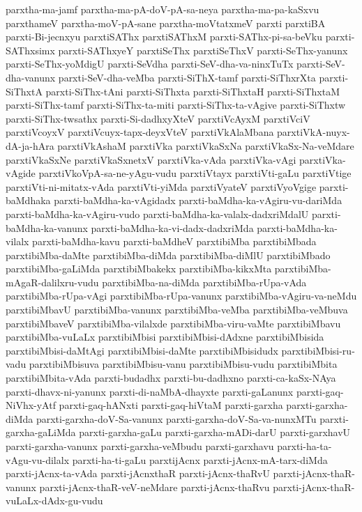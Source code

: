 {parxtha-ma-jamf
parxtha-ma-pA-doV-pA-sa-neya
parxtha-ma-pa-kaSxvu
parxthameV
parxtha-moV-pA-sane
parxtha-moVtatxmeV
parxti
parxtiBA
parxti-Bi-jecnxyu
parxtiSAThx
parxtiSAThxM
parxti-SAThx-pi-sa-beVku
parxti-SAThxsimx
parxti-SAThxyeY
parxtiSeThx
parxtiSeThxV
parxti-SeThx-yanunx
parxti-SeThx-yoMdigU
parxti-SeVdha
parxti-SeV-dha-va-ninxTuTx
parxti-SeV-dha-vanunx
parxti-SeV-dha-veMba
parxti-SiThX-tamf
parxti-SiThxrXta
parxti-SiThxtA
parxti-SiThx-tAni
parxti-SiThxta
parxti-SiThxtaH
parxti-SiThxtaM
parxti-SiThx-tamf
parxti-SiThx-ta-miti
parxti-SiThx-ta-vAgive
parxti-SiThxtw
parxti-SiThx-twsathx
parxti-Si-dadhxyXteV
parxtiVcAyxM
parxtiVciV
parxtiVcoyxV
parxtiVcuyx-tapx-deyxVteV
parxtiVkAlaMbana
parxtiVkA-nuyx-dA-ja-hAra
parxtiVkAshaM
parxtiVka
parxtiVkaSxNa
parxtiVkaSx-Na-veMdare
parxtiVkaSxNe
parxtiVkaSxnetxV
parxtiVka-vAda
parxtiVka-vAgi
parxtiVka-vAgide
parxtiVkoVpA-sa-ne-yAgu-vudu
parxtiVtayx
parxtiVti-gaLu
parxtiVtige
parxtiVti-ni-mitatx-vAda
parxtiVti-yiMda
parxtiVyateV
parxtiVyoVgige
parxti-baMdhaka
parxti-baMdha-ka-vAgidadx
parxti-baMdha-ka-vAgiru-vu-dariMda
parxti-baMdha-ka-vAgiru-vudo
parxti-baMdha-ka-valalx-dadxriMdalU
parxti-baMdha-ka-vanunx
parxti-baMdha-ka-vi-dadx-dadxriMda
parxti-baMdha-ka-vilalx
parxti-baMdha-kavu
parxti-baMdheV
parxtibiMba
parxtibiMbada
parxtibiMba-daMte
parxtibiMba-diMda
parxtibiMba-diMlU
parxtibiMbado
parxtibiMba-gaLiMda
parxtibiMbakekx
parxtibiMba-kikxMta
parxtibiMba-mAgaR-dalilxru-vudu
parxtibiMba-na-diMda
parxtibiMba-rUpa-vAda
parxtibiMba-rUpa-vAgi
parxtibiMba-rUpa-vanunx
parxtibiMba-vAgiru-va-neMdu
parxtibiMbavU
parxtibiMba-vanunx
parxtibiMba-veMba
parxtibiMba-veMbuva
parxtibiMbaveV
parxtibiMba-vilalxde
parxtibiMba-viru-vaMte
parxtibiMbavu
parxtibiMba-vuLaLx
parxtibiMbisi
parxtibiMbisi-dAdxne
parxtibiMbisida
parxtibiMbisi-daMtAgi
parxtibiMbisi-daMte
parxtibiMbisidudx
parxtibiMbisi-ru-vadu
parxtibiMbisuva
parxtibiMbisu-vanu
parxtibiMbisu-vudu
parxtibiMbita
parxtibiMbita-vAda
parxti-budadhx
parxti-bu-dadhxno
parxti-ca-kaSx-NAya
parxti-dhavx-ni-yanunx
parxti-di-naMbA-dhayxte
parxti-gaLanunx
parxti-gaq-NiVhx-yAtf
parxti-gaq-hANxti
parxti-gaq-hiVtaM
parxti-garxha
parxti-garxha-diMda
parxti-garxha-doV-Sa-vanunx
parxti-garxha-doV-Sa-va-nunxMTu
parxti-garxha-gaLiMda
parxti-garxha-gaLu
parxti-garxha-mADi-darU
parxti-garxhavU
parxti-garxha-vanunx
parxti-garxha-veMbudu
parxti-garxhavu
parxti-ha-ta-vAgu-vu-dilalx
parxti-ha-ti-gaLu
parxtijAcnx
parxti-jAcnx-mA-tarx-diMda
parxti-jAcnx-ta-vAda
parxti-jAcnxthaR
parxti-jAcnx-thaRvU
parxti-jAcnx-thaR-vanunx
parxti-jAcnx-thaR-veV-neMdare
parxti-jAcnx-thaRvu
parxti-jAcnx-thaR-vuLaLx-dAdx-gu-vudu
}
